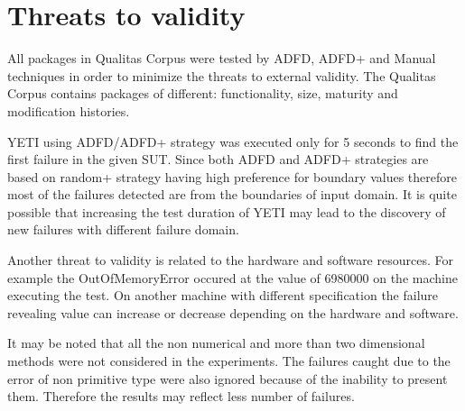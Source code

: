 \documentclass[runningheads,a4paper]{llncs}
\begin{document}



\section{Threats to validity} \label{sec:threat}
All packages in Qualitas Corpus were tested by ADFD, ADFD+ and Manual techniques in order to minimize the threats to external validity. The Qualitas Corpus contains packages of different: functionality, size, maturity and modification histories.

YETI using ADFD/ADFD+ strategy was executed only for 5 seconds to find the first failure in the given SUT. Since both ADFD and ADFD+ strategies are based on random+ strategy having high preference for boundary values therefore most of the failures detected are from the boundaries of input domain. It is quite possible that increasing the test duration of YETI may lead to the discovery of new failures with different failure domain.

Another threat to validity is related to the hardware and software resources. For example the OutOfMemoryError occured at the value of 6980000 on the machine executing the test. On another machine with different specification the failure revealing value can increase or decrease depending on the hardware and software.

It may be noted that all the non numerical and more than two dimensional methods were not considered in the experiments. The failures caught due to the error of non primitive type were also ignored because of the inability to present them. Therefore the results may reflect less number of failures.










\end{document}
